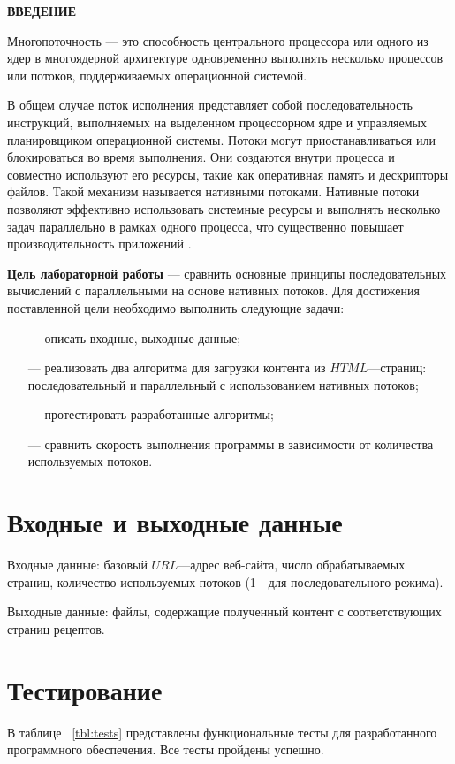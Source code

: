 \begin{center}
    \textbf{ВВЕДЕНИЕ}
\end{center}

Многопоточность — это способность центрального процессора или одного из ядер в многоядерной архитектуре одновременно выполнять несколько процессов или потоков, поддерживаемых операционной системой.

В общем случае поток исполнения представляет собой последовательность инструкций, выполняемых на выделенном процессорном ядре и управляемых планировщиком операционной системы. Потоки могут приостанавливаться или блокироваться во время выполнения. Они создаются внутри процесса и совместно используют его ресурсы, такие как оперативная память и дескрипторы файлов. Такой механизм называется нативными потоками. Нативные потоки позволяют эффективно использовать системные ресурсы и выполнять несколько задач параллельно в рамках одного процесса, что существенно повышает производительность приложений \cite{threads}.

\textbf{Цель лабораторной работы} --- сравнить основные принципы последовательных вычислений с параллельными на основе нативных потоков. Для достижения поставленной цели необходимо выполнить следующие задачи:

\begin{itemize}
    \item[---] описать входные, выходные данные;
    \item[---] реализовать два алгоритма для загрузки контента из $HTML$---страниц: последовательный и параллельный с использованием нативных потоков;
    \item[---] протестировать разработанные алгоритмы;
    \item[---] сравнить скорость выполнения программы в зависимости от количества используемых потоков.
\end{itemize}


\chapter{Входные и выходные данные}

Входные данные: базовый $URL$---адрес веб-сайта, число обрабатываемых страниц, количество используемых потоков (1 - для последовательного режима).

Выходные данные: файлы, содержащие полученный контент с соответствующих страниц рецептов.


\chapter{Тестирование}
В таблице ~\ref{tbl:tests} представлены функциональные тесты для разработанного
программного обеспечения. Все тесты пройдены успешно.

